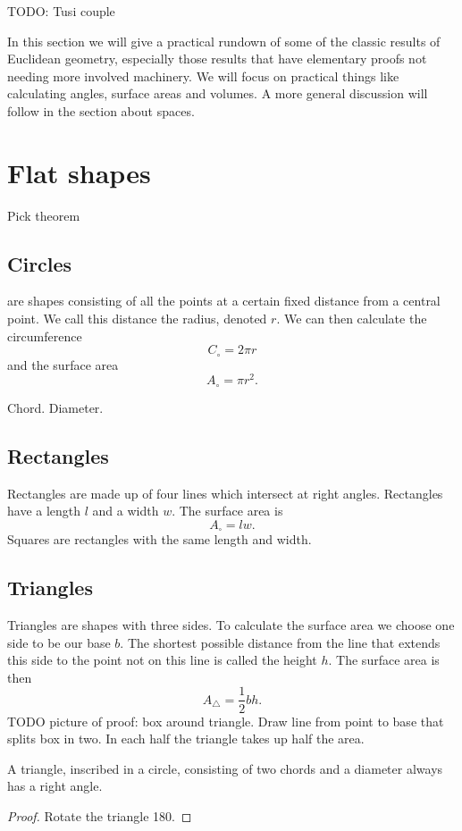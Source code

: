 TODO: Tusi couple

In this section we will give a practical rundown of some of the classic results of Euclidean geometry, especially those results that have elementary proofs not needing more involved machinery. We will focus on practical things like calculating angles, surface areas and volumes. A more general discussion will follow in the section about spaces.

\section{Flat shapes}
Pick theorem

\subsection{Circles} are shapes consisting of all the points at a certain fixed distance from a central point. We call this distance the radius, denoted $r$. 
We can then calculate the circumference
\[ C_\circ = 2\pi r \]
and the surface area
\[ A_\circ = \pi r^2. \]
\begin{definition}
Chord. Diameter.
\end{definition}

\subsection{Rectangles}
Rectangles are made up of four lines which intersect at right angles. Rectangles have a length $l$ and a width $w$. The surface area is
\[A_\square = lw.\]
Squares are rectangles with the same length and width.

\subsection{Triangles}
Triangles are shapes with three sides. To calculate the surface area we choose one side to be our base $b$. The shortest possible distance from the line that extends this side to the point not on this line is called the height $h$. The surface area is then
\[ A_\triangle = \frac{1}{2}bh. \]
TODO picture of proof: box around triangle. Draw line from point to base that splits box in two. In each half the triangle takes up half the area.

\begin{proposition}
A triangle, inscribed in a circle, consisting of two chords and a diameter always has a right angle.
\end{proposition}
\begin{proof}
Rotate the triangle 180\textdegree.
\end{proof}

